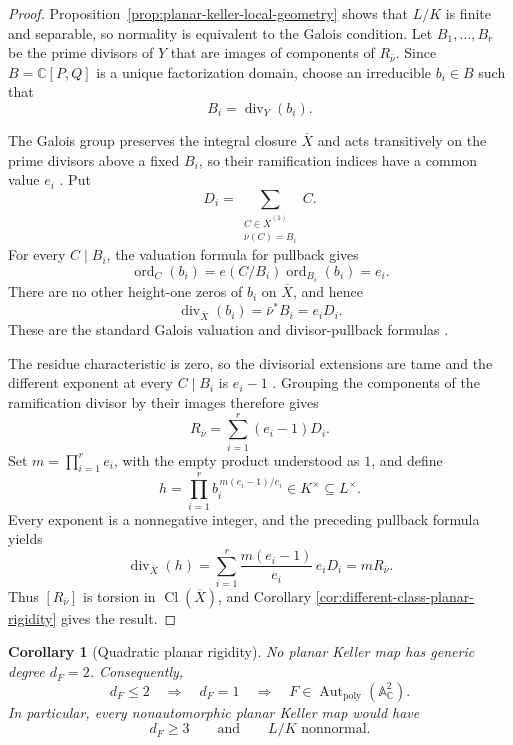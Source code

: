 \documentclass[11pt]{article}
\newtheorem{corollary}[theorem]{Corollary}
\theoremstyle{remark}
\theoremstyle{definition}
\DeclareMathOperator{\Aut}{Aut}
\newcommand{\A}{\mathbb A}
\newcommand{\C}{\mathbb C}
\begin{document}
\begin{proof}
Proposition~\ref{prop:planar-keller-local-geometry} shows that \(L/K\) is
finite and separable, so normality is equivalent to the Galois condition.
Let \(B_1,\dots,B_r\) be the prime divisors of \(Y\) that are images of
components of \(R_{\bar\nu}\).  Since \(B=\C[P,Q]\) is a unique
factorization domain, choose an irreducible \(b_i\in B\) such that
\[
  B_i=\operatorname{div}_Y(b_i).
\]

The Galois group preserves the integral closure \(\overline X\) and acts
transitively on the prime divisors above a fixed \(B_i\), so their
ramification indices have a common value \(e_i\)
\cite{StacksGaloisIntegralClosure}.  Put
\[
  D_i=
  \sum_{\substack{C\in\overline X^{(1)}\\ \bar\nu(C)=B_i}} C.
\]
For every \(C\mid B_i\), the valuation formula for pullback gives
\[
  \operatorname{ord}_C(b_i)
  =e(C/B_i)\operatorname{ord}_{B_i}(b_i)=e_i.
\]
There are no other height-one zeros of \(b_i\) on \(\overline X\), and
hence
\[
  \operatorname{div}_{\overline X}(b_i)
  =\bar\nu^*B_i=e_iD_i.
\]
These are the standard Galois valuation and divisor-pullback formulas
\cite{StacksDVRExtensions,StacksRamificationTheory}.

The residue characteristic is zero, so the divisorial extensions are tame
and the different exponent at every \(C\mid B_i\) is \(e_i-1\)
\cite{StacksRiemannHurwitzTame}.  Grouping
the components of the ramification divisor by their images therefore gives
\[
  R_{\bar\nu}=\sum_{i=1}^r(e_i-1)D_i.
\]
Set \(m=\prod_{i=1}^r e_i\), with the empty product understood as \(1\),
and define
\[
  h=\prod_{i=1}^r b_i^{\,m(e_i-1)/e_i}\in K^\times\subseteq L^\times.
\]
Every exponent is a nonnegative integer, and the preceding pullback formula
yields
\[
  \operatorname{div}_{\overline X}(h)
  =\sum_{i=1}^r\frac{m(e_i-1)}{e_i}\,e_iD_i
  =mR_{\bar\nu}.
\]
Thus \([R_{\bar\nu}]\) is torsion in
\(\operatorname{Cl}(\overline X)\), and Corollary
\ref{cor:different-class-planar-rigidity} gives the result.
\end{proof}

\begin{corollary}[Quadratic planar rigidity]
\label{cor:quadratic-planar-rigidity}
No planar Keller map has generic degree \(d_F=2\).  Consequently,
\[
  d_F\leq2
  \quad\Longrightarrow\quad
  d_F=1
  \quad\Longrightarrow\quad
  F\in\Aut_{\mathrm{poly}}(\A^2_{\C}).
\]
In particular, every nonautomorphic planar Keller map would have
\[
  d_F\geq3
  \qquad\text{and}\qquad
  L/K\text{ nonnormal}.
\]
\end{corollary}
\end{document}

